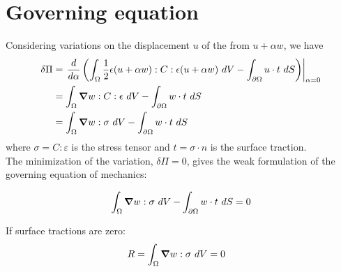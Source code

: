 \documentclass[10pt]{article}
\newcommand{\gv}[1]{\ensuremath{\mbox{\boldmath$ #1 $}}}
\newcommand{\grad}[1]{\gv{\nabla} #1}
\begin{document}
\section{Governing equation}
Considering variations on the displacement $u$ of the from $u+\alpha w$, we have
\begin{align}
\delta \Pi &=  \left. \frac{d}{d\alpha} \left( \int_{\Omega}    \frac{1}{2}\epsilon(u+\alpha w)  : C : \epsilon(u+\alpha w) ~dV  - \int_{\partial \Omega}   u \cdot t  ~dS \right) \right\vert_{\alpha=0}\\
&=  \int_{\Omega}   \grad w : C :  \epsilon  ~dV -  \int_{\partial \Omega}   w \cdot t~dS\\
&=  \int_{\Omega}   \grad w : \sigma  ~dV -  \int_{\partial \Omega}   w \cdot t  ~dS
\end{align}
where $\sigma = C :  \varepsilon$ is the stress tensor and $t=\sigma \cdot n$ is the surface traction.\\

The minimization of the variation, $\delta \Pi=0$, gives the weak formulation of the governing equation of mechanics:

\begin{align}
\int_{\Omega}   \grad w : \sigma  ~dV -  \int_{\partial \Omega}   w \cdot t  ~dS = 0
\end{align}

If surface tractions are zero: \\
\begin{align}
R &=  \int_{\Omega}   \grad w :  \sigma ~dV = 0 
\end{align}
\end{document}
